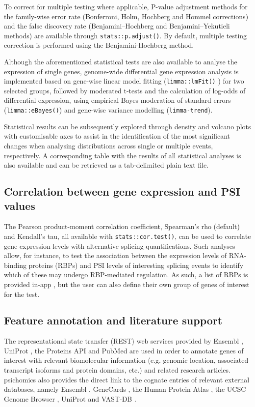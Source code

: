 To correct for multiple testing where applicable, P-value adjustment methods for the family-wise error rate (Bonferroni, Holm, Hochberg and Hommel corrections) and the false discovery rate (Benjamini–Hochberg and Benjamini–Yekutieli methods) are available through \texttt{stats::p.adjust()}. By default, multiple testing correction is performed using the Benjamini-Hochberg method.

Although the aforementioned statistical tests are also available to analyse the expression of single genes, genome-wide differential gene expression analysis is implemented based on gene-wise linear model fitting (\texttt{limma::lmFit()} \cite{ritchie:2015tm}) for two selected groups, followed by moderated t-tests and the calculation of log-odds of differential expression, using empirical Bayes moderation of standard errors (\texttt{limma::eBayes()}) and gene-wise variance modelling (\texttt{limma-trend}).

Statistical results can be subsequently explored through density and volcano plots with customisable axes to assist in the identification of the most significant changes when analysing distributions across single or multiple events, respectively. A corresponding table with the results of all statistical analyses is also available and can be retrieved as a tab-delimited plain text file.

\subsection{Correlation between gene expression and PSI values}

The Pearson product-moment correlation coefficient, Spearman's rho (default) and Kendall's tau, all available with \texttt{stats::cor.test()}, can be used to correlate gene expression levels with alternative splicing quantifications. Such analyses allow, for instance, to test the association between the expression levels of RNA-binding proteins (RBPs) and PSI levels of interesting splicing events to identify which of these may undergo RBP-mediated regulation. As such, a list of RBPs is provided in-app \cite{sebestyen:2016tr}, but the user can also define their own group of genes of interest for the test.

\subsection{Feature annotation and literature support}

The representational state transfer (REST) web services provided by Ensembl \cite{yates:2015uo}, UniProt \cite{wu:2006vq}, the Proteins API \cite{nightingale:2017uq} and PubMed \cite{roberts:2001tg} are used in order to annotate genes of interest with relevant biomolecular information (e.g. genomic location, associated transcript isoforms and protein domains, etc.) and related research articles. psichomics also provides the direct link to the cognate entries of relevant external databases, namely Ensembl \cite{cunningham:2015wt}, GeneCards \cite{fishilevich:2016wh}, the Human Protein Atlas \cite{uhlen:2015tg}, the UCSC Genome Browser \cite{goldman:2015un}, UniProt \cite{wu:2006vq} and VAST-DB \cite{tapial:2017ui}.


